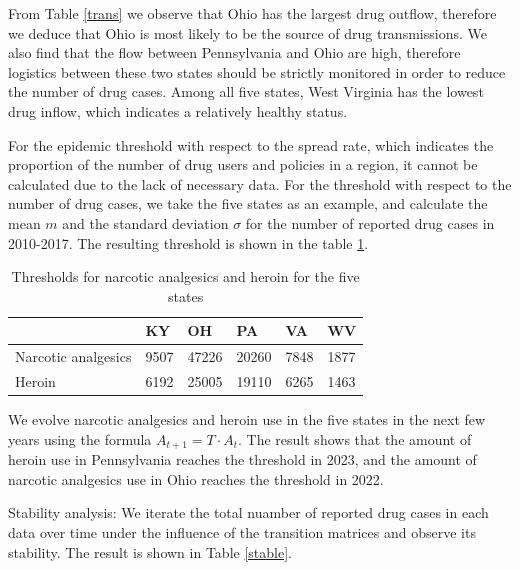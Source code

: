 \documentclass[13pt]{ctexart}
\begin{document}
From Table \ref{trans} we observe that Ohio has the largest drug outflow, therefore we deduce that Ohio is most likely to be the source of drug transmissions. We also find that the flow between Pennsylvania and Ohio are high, therefore logistics between these two states should be strictly monitored in order to reduce the number of drug cases. Among all five states, West Virginia has the lowest drug inflow, which indicates a relatively healthy status.

For the epidemic threshold with respect to the spread rate, which indicates the proportion of the number of drug users and policies  in a region, it cannot be calculated due to the lack of necessary data. For the threshold with respect to the number of drug cases, we take the five states as an example, and calculate the mean $m$ and the standard deviation $\sigma$ for the number of reported drug cases in 2010-2017. The resulting threshold is shown in the table \ref{the}.

\begin{table}
	\caption{Thresholds for narcotic analgesics and heroin for the five states}
	\label{the}
	\begin{tabular}{C{5em}C{5em}C{5em}C{5em}C{5em}C{5em}}
		\toprule
		{ } & KY & OH & PA & VA & WV \\ \midrule
		{Narcotic analgesics} & 9507 & 47226 & 20260 & 7848 & 1877\\
		{Heroin} &6192&25005&19110&6265&1463\\\bottomrule
	\end{tabular}
\end{table}

We evolve narcotic analgesics and heroin use in the five states in the next few years using the formula $A_{t+1}=T\cdot A_{t}$. The result shows that the amount of heroin use in Pennsylvania reaches the threshold in 2023, and the amount of narcotic analgesics use in Ohio reaches the threshold in 2022.

Stability analysis: We iterate the total nuamber of reported drug cases in each data over time under the influence of the transition matrices and observe its stability. The result is shown in Table \ref{stable}.
\end{document}
